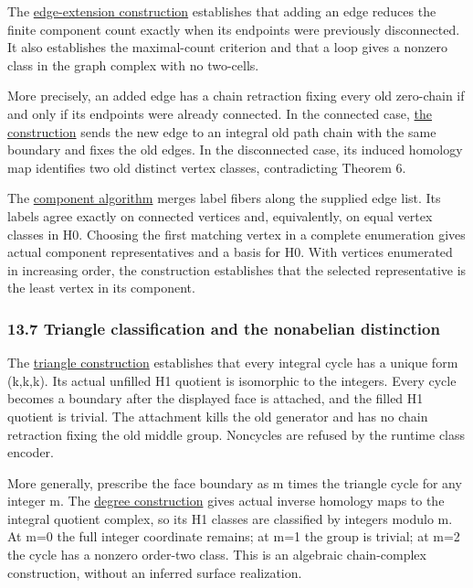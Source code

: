 \documentclass[
  11pt,
]{article}
\begin{document}
The \href{lean4/GraphExtensions.lean}{edge-extension construction}
establishes that adding an edge reduces the finite component count
exactly when its endpoints were previously disconnected. It also
establishes the maximal-count criterion and that a loop gives a nonzero
class in the graph complex with no two-cells.

More precisely, an added edge has a chain retraction fixing every old
zero-chain if and only if its endpoints were already connected. In the
connected case, \href{lean4/GraphRetraction.lean}{the construction}
sends the new edge to an integral old path chain with the same boundary
and fixes the old edges. In the disconnected case, its induced homology
map identifies two old distinct vertex classes, contradicting Theorem 6.

The \href{lean4/UnionComponents.lean}{component algorithm} merges label
fibers along the supplied edge list. Its labels agree exactly on
connected vertices and, equivalently, on equal vertex classes in H0.
Choosing the first matching vertex in a complete enumeration gives
actual component representatives and a basis for H0. With vertices
enumerated in increasing order, the construction establishes that the
selected representative is the least vertex in its component.

\subsubsection{13.7 Triangle classification and the nonabelian
distinction}\label{triangle-classification-and-the-nonabelian-distinction}

The \href{lean4/TriangleHomology.lean}{triangle construction}
establishes that every integral cycle has a unique form (k,k,k). Its
actual unfilled H1 quotient is isomorphic to the integers. Every cycle
becomes a boundary after the displayed face is attached, and the filled
H1 quotient is trivial. The attachment kills the old generator and has
no chain retraction fixing the old middle group. Noncycles are refused
by the runtime class encoder.

More generally, prescribe the face boundary as m times the triangle
cycle for any integer m. The \href{lean4/TriangleDegree.lean}{degree
construction} gives actual inverse homology maps to the integral
quotient complex, so its H1 classes are classified by integers modulo m.
At m=0 the full integer coordinate remains; at m=1 the group is trivial;
at m=2 the cycle has a nonzero order-two class. This is an algebraic
chain-complex construction, without an inferred surface realization.
\end{document}
